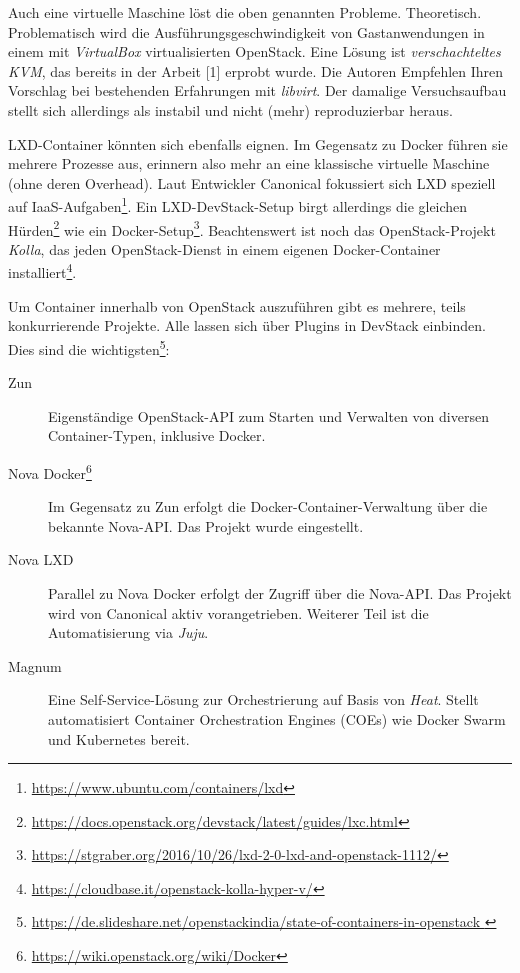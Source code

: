\noindent Auch eine virtuelle Maschine löst die oben genannten Probleme. Theoretisch. Problematisch wird die Ausführungsgeschwindigkeit von Gastanwendungen in einem mit \emph{VirtualBox} virtualisierten OpenStack. Eine Lösung ist \emph{verschachteltes KVM}, das bereits in der Arbeit [1] erprobt wurde. Die Autoren Empfehlen Ihren Vorschlag bei bestehenden Erfahrungen mit \emph{libvirt}. Der damalige Versuchsaufbau stellt sich allerdings als instabil und nicht (mehr) reproduzierbar heraus. %


LXD-Container könnten sich ebenfalls eignen. Im Gegensatz zu Docker führen sie mehrere Prozesse aus, erinnern also mehr an eine klassische virtuelle Maschine (ohne deren Overhead). Laut Entwickler Canonical fokussiert sich LXD speziell auf IaaS-Aufgaben\footnote{\url{https://www.ubuntu.com/containers/lxd}}. Ein LXD-DevStack-Setup birgt allerdings die gleichen Hürden\footnote{\url{https://docs.openstack.org/devstack/latest/guides/lxc.html}} wie ein Docker-Setup\footnote{\url{https://stgraber.org/2016/10/26/lxd-2-0-lxd-and-openstack-1112/}}. Beachtenswert ist noch das OpenStack-Projekt \emph{Kolla}, das jeden OpenStack-Dienst in einem eigenen Docker-Container installiert\footnote{\url{https://cloudbase.it/openstack-kolla-hyper-v/}}.

Um Container innerhalb von OpenStack auszuführen gibt es mehrere, teils konkurrierende Projekte. Alle lassen sich über Plugins in DevStack einbinden. Dies sind die wichtigsten\footnote{\url{https://de.slideshare.net/openstackindia/state-of-containers-in-openstack
}}:

\begin{description}
	\item[Zun] Eigenständige OpenStack-API zum Starten und Verwalten von diversen Container-Typen, inklusive Docker.
	\item[Nova Docker\footnote{\url{https://wiki.openstack.org/wiki/Docker}}] Im Gegensatz zu Zun erfolgt die Docker-Container-Verwaltung über die bekannte Nova-API. Das Projekt wurde eingestellt.
	\item[Nova LXD] Parallel zu Nova Docker erfolgt der Zugriff über die Nova-API. Das Projekt wird von Canonical aktiv vorangetrieben. Weiterer Teil ist die Automatisierung via \emph{Juju}.
	\item[Magnum] Eine Self-Service-Lösung zur Orchestrierung auf Basis von \emph{Heat}. Stellt automatisiert Container Orchestration Engines (COEs) wie Docker Swarm und Kubernetes bereit.
\end{description}

